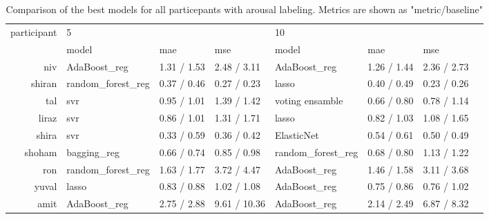 \begin{table}[!h]
    \begin{tabular}{rlllllll}
        \toprule
        participant & \multicolumn{3}{l}{5} & \multicolumn{3}{l}{10} \\
              &               model & mae & mse &              model & mae & mse \\
        \midrule
             niv &       AdaBoost\_reg &         1.31 / 1.53 &        2.48 / 3.11 &       AdaBoost\_reg &         1.26 / 1.44 &        2.36 / 2.73 \\
          shiran &  random\_forest\_reg &         0.37 / 0.46 &        0.27 / 0.23 &              lasso &         0.40 / 0.49 &        0.23 / 0.26 \\
             tal &                svr &         0.95 / 1.01 &        1.39 / 1.42 &    voting ensamble &         0.66 / 0.80 &        0.78 / 1.14 \\
           liraz &                svr &         0.86 / 1.01 &        1.31 / 1.71 &              lasso &         0.82 / 1.03 &        1.08 / 1.65 \\
           shira &                svr &         0.33 / 0.59 &        0.36 / 0.42 &         ElasticNet &         0.54 / 0.61 &        0.50 / 0.49 \\
          shoham &        bagging\_reg &         0.66 / 0.74 &        0.85 / 0.98 &  random\_forest\_reg &         0.68 / 0.80 &        1.13 / 1.22 \\
             ron &  random\_forest\_reg &         1.63 / 1.77 &        3.72 / 4.47 &       AdaBoost\_reg &         1.46 / 1.58 &        3.11 / 3.68 \\
           yuval &              lasso &         0.83 / 0.88 &        1.02 / 1.08 &       AdaBoost\_reg &         0.75 / 0.86 &        0.76 / 1.02 \\
            amit &       AdaBoost\_reg &         2.75 / 2.88 &       9.61 / 10.36 &       AdaBoost\_reg &         2.14 / 2.49 &        6.87 / 8.32 \\
        \bottomrule
    \end{tabular}
    \caption{Comparison of the best models for all particepants with arousal labeling. Metrics are shown as "metric/baseline"}  
\end{table}

